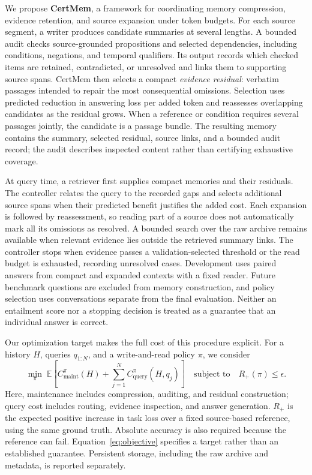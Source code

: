 \documentclass{article}
\begin{document}
We propose \textbf{CertMem}, a framework for coordinating memory compression,
evidence retention, and source expansion under token budgets. For each source
segment, a writer produces candidate summaries at several lengths. A bounded
audit checks source-grounded propositions and selected dependencies, including
conditions, negations, and temporal qualifiers. Its output records which checked
items are retained, contradicted, or unresolved and links them to supporting
source spans. CertMem then selects a compact \emph{evidence residual}: verbatim
passages intended to repair the most consequential omissions. Selection uses
predicted reduction in answering loss per added token and reassesses overlapping
candidates as the residual grows. When a reference or condition requires several
passages jointly, the candidate is a passage bundle. The resulting memory
contains the summary, selected residual, source links, and a bounded audit record;
the audit describes inspected content rather than certifying exhaustive coverage.

At query time, a retriever first supplies compact memories and their residuals.
The controller relates the query to the recorded gaps and selects additional
source spans when their predicted benefit justifies the added cost. Each expansion
is followed by reassessment, so reading part of a source does not automatically
mark all its omissions as resolved. A bounded search over the raw archive remains
available when relevant evidence lies outside the retrieved summary links.
The controller stops when evidence passes a validation-selected threshold or
the read budget is exhausted, recording unresolved cases. Development uses paired answers from
compact and expanded contexts with a fixed reader. Future benchmark questions
are excluded from memory construction, and policy selection uses conversations
separate from the final evaluation. Neither an entailment score nor a stopping
decision is treated as a guarantee that an individual answer is correct.

Our optimization target makes the full cost of this procedure explicit. For a
history $H$, queries $q_{1:N}$, and a write-and-read policy $\pi$, we consider
\begin{equation}
\min_{\pi}\;
\mathbb{E}\!\left[
 C_{\mathrm{maint}}^{\pi}(H)
 + \sum_{j=1}^{N} C_{\mathrm{query}}^{\pi}(H,q_j)
\right]
\quad\text{subject to}\quad
R_{+}(\pi)\leq\epsilon .
\label{eq:objective}
\end{equation}
Here, maintenance includes compression, auditing, and residual construction;
query cost includes routing, evidence inspection, and answer generation.
$R_{+}$ is the expected positive increase in task loss over a fixed source-based
reference, using the same ground truth. Absolute accuracy is also required because
the reference can fail. Equation~\ref{eq:objective} specifies a target rather than
an established guarantee. Persistent storage, including the raw archive and
metadata, is reported separately.
\end{document}
